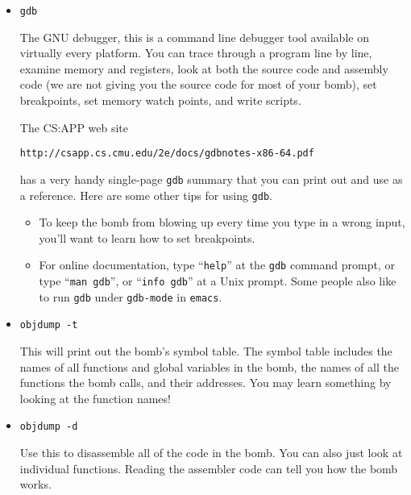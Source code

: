 \documentclass[11pt]{article}
\begin{document}
\begin{itemize}

\item {\tt gdb }

The GNU debugger, this is a command line debugger tool available on
virtually every platform.  You can trace through a program line by
line, examine memory and registers, look at both the source code and
assembly code (we are not giving you the source code for most of your
bomb), set breakpoints, set memory watch points, and write scripts.

The CS:APP web site 
\begin{verbatim}
http://csapp.cs.cmu.edu/2e/docs/gdbnotes-x86-64.pdf
\end{verbatim}
has a very handy single-page {\tt gdb} summary that you can print out
and use as a reference. Here are some other tips for using {\tt gdb}.
\begin{itemize}

\item To keep the bomb from blowing up every time you type in a wrong
input, you'll want to learn how to set breakpoints.

\item For online documentation, type ``{\tt help}'' at the {\tt gdb} 
command prompt, 
or type ``{\tt man gdb}'', or ``{\tt info gdb}'' at a Unix prompt.  
Some people also
like to run {\tt gdb} under {\tt gdb-mode} in {\tt emacs}.
\end{itemize}

\item \texttt{objdump -t}

This will print out the bomb's symbol table. The symbol table includes the
names of all functions and global variables in the bomb, the names of
all the functions the bomb calls, and their addresses.  You may learn
something by looking at the function names!

\item \texttt{objdump -d}

Use this to disassemble all of the code in the bomb.  You can also
just look at individual functions.  Reading the assembler code can
tell you how the bomb works. 



\end{itemize}
\end{document}
